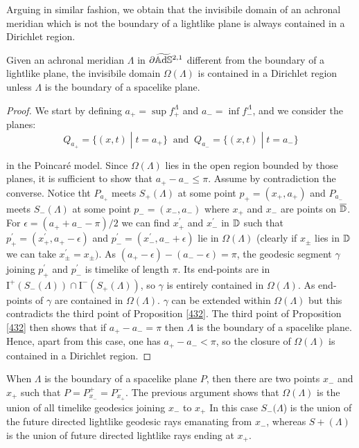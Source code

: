 Arguing in similar fashion, we obtain that the invisibile domain of an achronal meridian which is not the boundary of a lightlike plane is always contained in a Dirichlet region. 

\begin{proposition}\label{433}
    Given an achronal meridian $\Lambda$ in $\partial\widetilde{\mathbb{A}\mathrm{d}\mathbb{S}}{}^{2,1}$ different from the boundary of a lightlike plane, the invisibile domain $\Omega(\Lambda)$ is contained in a Dirichlet region unless $\Lambda$ is the boundary of a spacelike plane. 
\end{proposition}
\begin{proof}
    We start by defining $a_+=\sup f_+^{\Lambda}$ and $a_-=\inf f_-^{\Lambda}$, and we consider the planes: 
    \[
        Q_{a_+}=\{(x,t)\;|\;t=a_+\} \;\;\text{and}\;\; Q_{a_-}=\{(x,t)\;|\;t=a_-\}
   \]

   in the Poincaré model. Since $\Omega(\Lambda)$ lies in the open region bounded by those planes, it is sufficient to show that $a_+-a_-\leq\pi.$ Assume by contradiction the converse. Notice tht $P_{a_+}$ meets $S_+(\Lambda)$ at some point $p_+=(x_+,a_+)$ and $P_{a_-}$ meets $S_-(\Lambda)$ at some point $p_-=(x_-,a_-)$ where $x_+$ and $x_-$ are points on $\overline{\mathbb{D}}$. For $\epsilon=(a_+ + a_- -\pi )/2$ we can find $x^{\prime}_+$ and $x_-^{\prime} $ in $\mathbb{D}$ such that $p_+^{\prime}=(x^{\prime}_+,a_+-\epsilon)$ and $p_-^{\prime}=(x_-^{\prime},a_- +\epsilon)$ lie in $\Omega(\Lambda)$ (clearly if $x_\pm$ lies in $\mathbb{D}$ we can take $x_\pm^{\prime}=x_\pm)$. As $(a_+-\epsilon)-(a_- - \epsilon )=\pi$, the geodesic segment $\gamma$ joining $p_+^{\prime}$ and $p_-^{\prime}$ is timelike of length $\pi$. Its end-points are in $\text{I}^+(S_-(\Lambda))\cap\text{I}^-(S_+(\Lambda))$, so $\gamma$ is entirely contained in $\Omega(\Lambda)$. As end-points of $\gamma$ are contained in $\Omega(\Lambda).$ $\gamma$ can be extended within $\Omega(\Lambda)$ but this contradicts the third point of Proposition \ref{432}.       
   The third point of Proposition \ref{432} then shows that if $a_+-a_-=\pi$ then $\Lambda$ is the boundary of a spacelike plane. Hence, apart from this case, one has $a_+ - a_-<\pi$, so the closure of $\Omega(\Lambda)$ is contained in a Dirichlet region. 

\end{proof}
    
\begin{observation}
    When $\Lambda$ is the boundary of a spacelike plane $P$, then there are two points $x_-$ and $x_+$ such that $P=P_{x_-}^+=P_{x_+}^-.$ The previous argument shows that $\Omega(\Lambda)$ is the union of all timelike geodesics joining $x_-$ to $x_+$ In this case $S_-(\Lambda$) is the union of the future directed lightlike geodesic rays emanating from $x_-$, whereas $S+(\Lambda)$ is the union of future directed lightlike rays ending at $x_+$.  
\end{observation}

